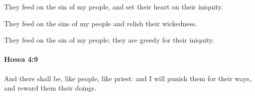 			\begin{versebox}
					\item[BHS] 
					\item[LXX] 
					\item[ASV] They feed on the sin of my people, and set their heart on their iniquity.
					\item[NIV] They feed on the sins of my people and relish their wickedness.
					\item[NRSV] They feed on the sin of my people; they are greedy for their iniquity.
			\end{versebox}

		\paragraph{Hosea 4:9} %
			\label{HOSEA-4-9}

			And there shall be, like people, like priest: and I will punish them for their ways, and reward them their doings.

